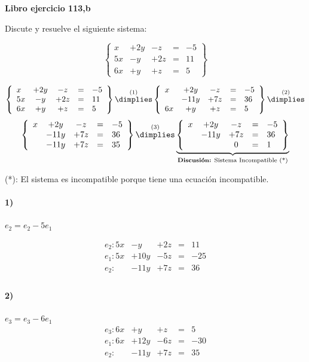 \documentclass[palatino,nosec]{Docencia}
\begin{document}
\newpage
\begin{problem}
\textbf{Libro ejercicio 113,b}

Discute y resuelve el siguiente sistema:

\[
\left\{\begin{array}{lcccl}
x&+2y&-z&=&-5\\
5x&-y&+2z&=&11\\
6x&+y&+z&=&5
\end{array}\right\}
\]

\solution

\[
\left\{\begin{array}{lcccl}
x&+2y&-z&=&-5\\
5x&-y&+2z&=&11\\
6x&+y&+z&=&5
\end{array}\right\}
\overset{(1)}{\dimplies}
\left\{\begin{array}{lcccl}
x&+2y&-z&=&-5\\
&-11y&+7z&=&36\\
6x&+y&+z&=&5
\end{array}\right\}
\overset{(2)}{\dimplies}\]
\[
\left\{\begin{array}{lcccl}
x&+2y&-z&=&-5\\
&-11y&+7z&=&36\\
& -11y&+7z&=&35
\end{array}\right\}
\overset{(3)}{\dimplies}
\underbrace{\left\{\begin{array}{lcccl}
x&+2y&-z&=&-5\\
&-11y&+7z&=&36\\
& &0&=&1
\end{array}\right\}}_{\text{\textbf{Discusión:} Sistema Incompatible (*)}}
\]

(*): El sistema es incompatible porque tiene una ecuación incompatible.


\paragraph{1)} $e_2 = e_2-5e_1$

\[
\begin{array}{lcccl}
e_2: 5x&-y&+2z&=&11\\
e_1: 5x&+10y&-5z&=&-25\\
\hline
e_2:   & -11y&+7z&=&36\\
\end{array}
\]	

\paragraph*{2)} $e_3 = e_3-6e_1$
\[
\begin{array}{lcccl}
e_3: 6x&+y&+z&=&5\\
e_1: 6x&+12y&-6z&=&-30\\
\hline
e_2:   & -11y&+7z&=&35\\
\end{array}
\]	


\end{problem}
\end{document}
